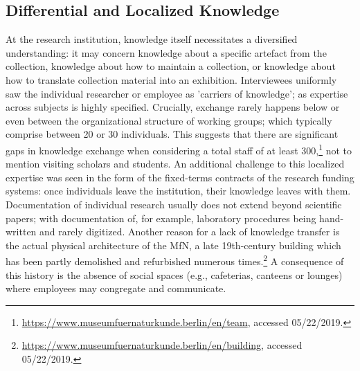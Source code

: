 \documentclass{article}
\begin{document}
\subsection{Differential and Localized Knowledge}
At the research institution, knowledge itself necessitates a diversified understanding: it may concern knowledge about a specific artefact from the collection, knowledge about how to maintain a collection, or knowledge about how to translate collection material into an exhibition. Interviewees uniformly saw the individual researcher or employee as 'carriers of knowledge'; as expertise across subjects is highly specified. Crucially, exchange rarely happens below or even between the organizational structure of working groups; which typically comprise between 20 or 30 individuals. This suggests that there are significant gaps in knowledge exchange when considering a total staff of at least 300,\footnote{\url{https://www.museumfuernaturkunde.berlin/en/team}, accessed 05/22/2019.} not to mention visiting scholars and students. An additional challenge to this localized expertise was seen in the form of the fixed-terms contracts of the research funding systems: once individuals leave the institution, their knowledge leaves with them. Documentation of individual research usually does not extend beyond scientific papers; with documentation of, for example, laboratory procedures being hand-written and rarely digitized. Another reason for a lack of knowledge transfer is the actual physical architecture of the MfN, a late 19th-century building which has been partly demolished and refurbished numerous times.\footnote{\url{https://www.museumfuernaturkunde.berlin/en/building}, accessed 05/22/2019.} A consequence of this history is the absence of social spaces (e.g., cafeterias, canteens or lounges) where employees may congregate and communicate. 
\end{document}
